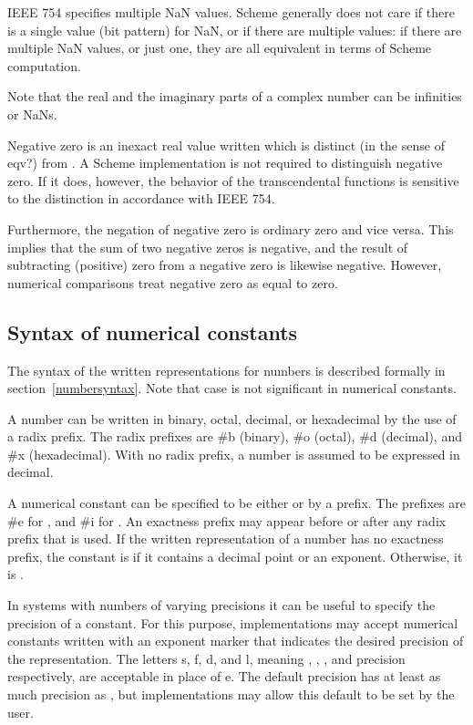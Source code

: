 IEEE 754 specifies multiple NaN values.  Scheme generally does
not care if there is a single value (bit pattern) for NaN,
or if there are multiple values: if there are multiple NaN
values, or just one, they are all equivalent in terms of Scheme
computation.

Note that the real and the imaginary parts of a complex number
can be infinities or NaNs.

Negative zero is an inexact real value written {} which is distinct
(in the sense of {\cf eqv?}) from {}.  A Scheme implementation
is not required to distinguish negative zero.  If it does, however, the
behavior of the transcendental functions is sensitive to the distinction
in accordance with IEEE 754.

Furthermore, the negation of negative zero is ordinary zero and vice
versa.  This implies that the sum of two negative zeros is negative,
and the result of subtracting (positive) zero from a negative zero is
likewise negative.  However, numerical comparisons treat negative zero
as equal to zero.

\subsection{Syntax of numerical constants}
\label{numbernotations}

The syntax of the written representations for numbers is described formally in
section~\ref{numbersyntax}.  Note that case is not significant in numerical
constants.

A number can be written in binary, octal, decimal, or
hexa\-decimal by the use of a radix prefix.  The radix prefixes are {\cf
\#b} (binary), {\cf \#o} (octal), {\cf
\#d} (decimal), and {\cf \#x} (hexa\-decimal).  With
no radix prefix, a number is assumed to be expressed in decimal.

A
numerical constant can be specified to be either  or
 by a prefix.  The prefixes are {\cf \#e}
for , and {\cf \#i} for .  An exactness
prefix may appear before or after any radix prefix that is used.  If
the written representation of a number has no exactness prefix, the
constant is
 if it contains a decimal point or an
exponent.
Otherwise, it is .

In systems with  numbers
of varying precisions it can be useful to specify
the precision of a constant.  For this purpose,
implementations may accept numerical constants
written with an exponent marker that indicates the
desired precision of the 
representation.  The letters {\cf s}, {\cf f},
{\cf d}, and {\cf l}, meaning , ,
, and  precision respectively,
are acceptable in place of {\cf e}.
The default precision has at least as much precision
as , but
implementations may allow this default to be set by the user.

